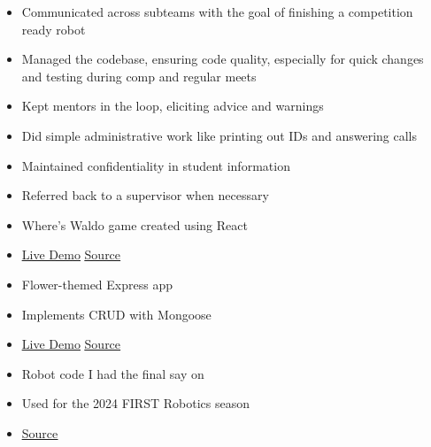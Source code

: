 \documentclass[10pt,a4paper,ragged2e,withhyper]{altacv}
\begin{document}
\begin{paracol}{2}

\begin{itemize}
\item Communicated across subteams with the goal of finishing a competition ready robot
\item Managed the codebase, ensuring code quality, especially for quick changes and testing during comp and regular meets
\item Kept mentors in the loop, eliciting advice and warnings
\end{itemize}

\divider

\begin{itemize}
\item Did simple administrative work like printing out IDs and answering calls
\item Maintained confidentiality in student information
\item Referred back to a supervisor when necessary
\end{itemize}


\begin{itemize}
\item Where's Waldo game created using React
\item \href{https://joel-singh.github.io/waldo}{\underline{Live Demo}} \href{https://github.com/Joel-Singh/waldo}{\underline{Source}}
\end{itemize}
\divider

\begin{itemize}
\item Flower-themed Express app
\item Implements CRUD with Mongoose
\item \href{joel-singh.com}{\underline{Live Demo}} \href{joel-singh.com}{\underline{Source}}
\end{itemize}
\divider

\begin{itemize}
\item Robot code I had the final say on
\item Used for the 2024 FIRST Robotics season
\item \href{https://github.com/Joel-Singh/Robot-2024}{\underline{Source}}
\end{itemize}



\end{paracol}
\end{document}
